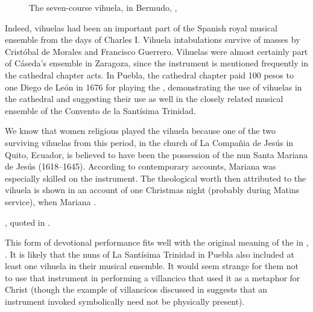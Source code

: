 \begin{figure}
    \caption{The seven-course vihuela, in Bermudo, , \folio{110\recto}}
    \label{fig:Bermudo-vihuela7}
\end{figure}

Indeed, vihuelas had been an important part of the Spanish royal musical ensemble
from the days of Charles I.
Vihuela intabulations survive of masses by Cristóbal de Morales and Francisco
Guerrero.%
    \Autocite[]{Grove}
Vihuelas were almost certainly part of Cáseda's ensemble in Zaragoza, since the
instrument is mentioned frequently in the cathedral chapter acts.%
    \Autocite{Calahorra:Zaragoza2}
In Puebla, the cathedral chapter paid 100 pesos to one Diego de León in 1676
for playing the , demonstrating the use of vihuelas in
the cathedral and suggesting their use as well in the closely related musical
ensemble of the Convento de la Santísima Trinidad.%
    \Autocite[44]{PerezRuiz:Aportes}


We know that women religious played the vihuela because one of the two
surviving vihuelas from this period, in the church of La Compañia de Jesús in
Quito, Ecuador, is believed to have been the possession of the nun Santa
Mariana de Jesús (1618--1645).
According to contemporary accounts, Mariana was especially skilled on the
instrument. 
The theological worth then attributed to the vihuela is shown in an account of
one Christmas night (probably during Matins service), when Mariana .%
\begin{Footnote}
    \Autocite[275]{EspinosaPolit:SantaMariana}, quoted in
    \Autocite[73]{Bermudez:Vihuela}.
\end{Footnote}
This form of devotional performance fits well with the original meaning of the
 in , .%
    \Autocite[]{BDAG}
It is likely that the nuns of La Santísima Trinidad in Puebla also included at
least one vihuela in their musical ensemble.
It would seem strange for them not to use that instrument in performing a
villancico that used it as a metaphor for Christ (though the example of
 villancicos discussed in  suggests that an
instrument invoked symbolically need not be physically present).

